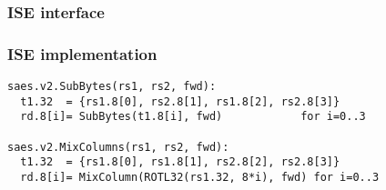 
\subsubsection{ISE interface}



\subsubsection{ISE implementation}

\begin{lstlisting}[language=pseudo,style=block]
saes.v2.SubBytes(rs1, rs2, fwd):
  t1.32  = {rs1.8[0], rs2.8[1], rs1.8[2], rs2.8[3]}
  rd.8[i]= SubBytes(t1.8[i], fwd)            for i=0..3

saes.v2.MixColumns(rs1, rs2, fwd):
  t1.32  = {rs1.8[0], rs1.8[1], rs2.8[2], rs2.8[3]}
  rd.8[i]= MixColumn(ROTL32(rs1.32, 8*i), fwd) for i=0..3
\end{lstlisting}


